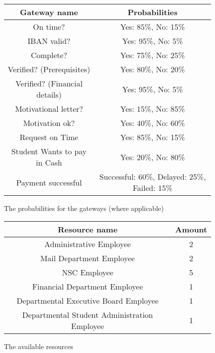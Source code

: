 \begin{figure}[h!]
	\centering
	\begin{tabular}{ | c | c | }
		\hline
		\textbf{Gateway name} & \textbf{Probabilities} \\ \hline\hline
		On time? & Yes: 85\%, No: 15\% \\ \hline
		IBAN valid? & Yes: 95\%, No: 5\% \\ \hline
		Complete? & Yes: 75\%, No: 25\% \\ \hline
		Verified? (Prerequisites) & Yes: 80\%, No: 20\% \\ \hline
		Verified? (Financial details) & Yes: 95\%, No: 5\% \\ \hline
		Motivational letter? & Yes: 15\%, No: 85\% \\ \hline
		Motivation ok? & Yes: 40\%, No: 60\% \\ \hline
		Request on Time & Yes: 85\%, No: 15\% \\ \hline	
		Student Wants to pay in Cash & Yes: 20\%, No: 80\% \\ \hline	
		Payment successful & Successful: 60\%, Delayed: 25\%, Failed: 15\% \\ \hline			
		\hline
	\end{tabular}
	\caption{The probabilities for the gateways (where applicable)}
	\label{fig:probabilities2}
\end{figure}

\begin{figure}[h!]
	\centering
	\begin{tabular}{ | c | c | }
		\hline
		\textbf{Resource name} & \textbf{Amount} \\ \hline\hline
		Administrative Employee & 2 \\ \hline		
		Mail Department Employee & 2 \\ \hline
		NSC Employee & 5 \\ \hline
		Financial Department Employee & 1 \\ \hline
		Departmental Executive Board Employee & 1 \\ \hline
		Departmental Student Administration Employee & 1 \\ \hline
		\hline
	\end{tabular}
	\caption{The available resources}
	\label{fig:resources}
\end{figure}